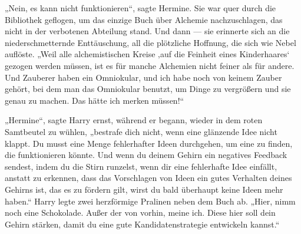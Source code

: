 „Nein, es kann nicht funktionieren“, sagte Hermine. Sie war quer durch die Bibliothek geflogen, um das einzige Buch über Alchemie nachzuschlagen, das nicht in der verbotenen Abteilung stand. Und dann — sie erinnerte sich an die niederschmetternde Enttäuschung, all die plötzliche Hoffnung, die sich wie Nebel auflöste.
„Weil alle alchemistischen Kreise ‚auf die Feinheit eines Kinderhaares‘ gezogen werden müssen, ist es für manche Alchemien nicht feiner als für andere. Und Zauberer haben ein Omniokular, und ich habe noch von keinem Zauber gehört, bei dem man das Omniokular benutzt, um Dinge zu vergrößern und sie genau zu machen. Das hätte ich merken müssen!“

„Hermine“, sagte Harry ernst, während er begann, wieder in dem roten Samtbeutel zu wühlen, „bestrafe dich nicht, wenn eine glänzende Idee nicht klappt. Du musst eine Menge fehlerhafter Ideen durchgehen, um eine zu finden, die funktionieren könnte. Und wenn du deinem Gehirn ein negatives Feedback sendest, indem du die Stirn runzelst, wenn dir eine fehlerhafte Idee einfällt, anstatt zu erkennen, dass das Vorschlagen von Ideen ein gutes Verhalten deines Gehirns ist, das es zu fördern gilt, wirst du bald überhaupt keine Ideen mehr haben.“
Harry legte zwei herzförmige Pralinen neben dem Buch ab.
„Hier, nimm noch eine Schokolade. Außer der von vorhin, meine ich. Diese hier soll dein Gehirn stärken, damit du eine gute Kandidatenstrategie entwickeln kannst.“

